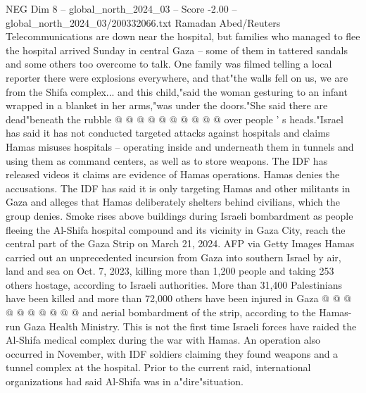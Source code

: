 \begin{textsample}{NEG Dim 8 – global\_north\_2024\_03 – Score -2.00 – global\_north\_2024\_03/200332066.txt}
Ramadan Abed/Reuters Telecommunications are down near the hospital, but families who managed to flee the hospital arrived Sunday in central Gaza -- some of them in tattered sandals and some others too overcome to talk.
One family was filmed telling a local reporter there were explosions everywhere, and that"the walls fell on us, we are from the Shifa complex... and this child,"said the woman gesturing to an infant wrapped in a blanket in her arms,"was under the doors."She said there are dead"beneath the rubble @ @ @ @ @ @ @ @ @ @ over people ' s heads."Israel has said it has not conducted targeted attacks against hospitals and claims Hamas misuses hospitals -- operating inside and underneath them in tunnels and using them as command centers, as well as to store weapons.
The IDF has released videos it claims are evidence of Hamas operations.
Hamas denies the accusations.
The IDF has said it is only targeting Hamas and other militants in Gaza and alleges that Hamas deliberately shelters behind civilians, which the group denies.
Smoke rises above buildings during Israeli bombardment as people fleeing the Al-Shifa hospital compound and its vicinity in Gaza City, reach the central part of the Gaza Strip on March 21, 2024.
AFP via Getty Images Hamas carried out an unprecedented incursion from Gaza into southern Israel by air, land and sea on Oct. 7, 2023, killing more than 1,200 people and taking 253 others hostage, according to Israeli authorities.
More than 31,400 Palestinians have been killed and more than 72,000 others have been injured in Gaza @ @ @ @ @ @ @ @ @ @ and aerial bombardment of the strip, according to the Hamas-run Gaza Health Ministry.
This is not the first time Israeli forces have raided the Al-Shifa medical complex during the war with Hamas.
An operation also occurred in November, with IDF soldiers claiming they found weapons and a tunnel complex at the hospital.
Prior to the current raid, international organizations had said Al-Shifa was in a"dire"situation.

\end{textsample}
